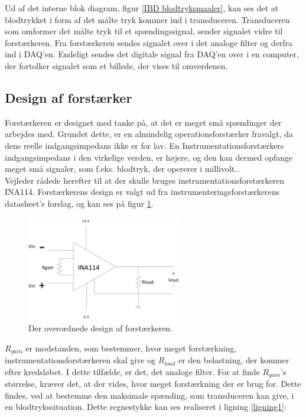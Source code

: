 Ud af det interne blok diagram, figur \ref{IBD blodtryksmaaler}, kan ses det at blodtrykket i form af det målte tryk kommer ind i transduceren. Transduceren som omformer det målte tryk til et spændingssignal, sender signalet vidre til forstærkeren. Fra forstærkeren sendes signalet over i det analoge filter og derfra ind i DAQ'en. Endeligt sendes det digitale signal fra DAQ'en over i en computer, der fortolker signalet som et billede, der vises til omverdenen.

\subsection{Design af forstærker}
Forstærkeren er designet med tanke på, at det er meget små spændinger der arbejdes med. Grundet dette, er en almindelig operationsforstærker fravalgt, da dens reelle indgangsimpedans ikke er for lav. En Instrumentationsforstærkers indgangsimpedans i den virkelige verden, er højere, og den kan dermed opfange meget små signaler, som f.eks. blodtryk, der opererer i millivolt..\\
Vejleder rådede herefter til at der skulle bruges instrumentationsforstærkeren INA114. Forstærkerens design er valgt ud fra instrumenteringsforstærkerens datasheet’s forslag, og kan ses på figur \ref{labelpic}.\\ 
\begin{figure}[H]
	\centering
	\includegraphics[width=0.6\textwidth]{Figurer/Hardware/Forstaerker}
	\caption{Der overordnede design af forstærkeren.}\label{labelpic}
\end{figure}



$R_{gain}$ er modstanden, som bestemmer, hvor meget forstærkning, instrumentationsforstærkeren skal give og $R_{load}$ er den belastning, der kommer efter kredsløbet. I dette tilfælde, er det, det analoge filter. For at finde $R_{gain}$’s størrelse, kræver det, at der vides, hvor meget forstærkning der er brug for. Dette findes, ved at bestemme den maksimale spænding, som transduceren kan give, i en blodtrykssituation. Dette regnestykke kan ses realiseret i ligning \ref{ligning1}:


